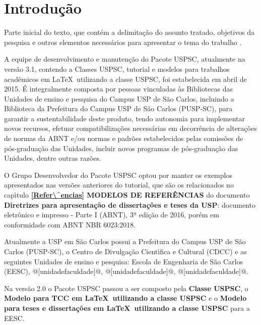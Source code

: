 
\chapter[Introdu\c{c}\~ao]{Introdu\c{c}\~ao}
\label{Introdu\c{c}\~ao}

Parte inicial do texto, que cont\'em a delimita\c{c}\~ao do assunto tratado, objetivos da pesquisa e outros elementos necess\'arios para apresentar o tema do trabalho \cite{aguia2020}.

A equipe de desenvolvimento e manuten\c{c}\~ao do Pacote USPSC, atualmente na vers\~ao 3.1, contendo a Classes USPSC, tutorial e modelos para trabalhos acad\^emicos em \LaTeX\ utilizando a classe USPSC, foi estabelecida em abril de 2015. \'E integralmente composta por pessoas vinculadas \`as Bibliotecas das Unidades de ensino e pesquisa do Campus USP de S\~ao Carlos, incluindo a Biblioteca da Prefeitura do Campus USP de S\~ao Carlos (PUSP-SC), para garantir a sustentabilidade deste produto, tendo autonomia para implementar novos recursos, efetuar compatibiliza\c{c}\~oes necess\'arias em decorr\^encia de altera\c{c}\~oes de normas da ABNT e/ou normas e padr\~oes estabelecidos pelas comiss\~oes de p\'os-gradua\c{c}\~ao das Unidades, incluir novos programas de p\'os-gradua\c{c}\~ao das Unidades, dentre outras raz\~oes.

O Grupo Desenvolvedor do Pacote USPSC optou por manter os exemplos apresentados nas vers\~oes anteriores do tutorial, que s\~ao os relacionados no cap\'{\i}tulo \textbf{\ref{Refer\^encias} MODELOS DE REFER\^ENCIAS} do documento \textbf{Diretrizes para apresenta\c{c}\~ao de disserta\c{c}\~oes e teses da USP}: documento eletr\^onico e impresso - Parte I (ABNT), 3ª edi\c{c}\~ao de 2016, por\'em em conformidade com ABNT NBR 6023:2018. 

Atualmente a USP em S\~ao Carlos possui a Prefeitura do Campus USP de S\~ao Carlos (PUSP-SC), o Centro de Divulga\c{c}\~ao Cient\'{\i}fica e Cultural (CDCC) e as seguintes Unidades de ensino e pesquisa: Escola de Engenharia de S\~ao Carlos (EESC), @[unidadefaculdade]@, @[unidadefaculdade]@, @[unidadefaculdade]@.

Na vers\~ao 2.0 o Pacote USPSC passou a ser composto pela \textbf{Classe USPSC}, o \textbf{Modelo para TCC em \LaTeX\ utilizando a classe USPSC} e o \textbf{Modelo para teses e disserta\c{c}\~oes em \LaTeX\ utilizando a classe USPSC} para a EESC.

